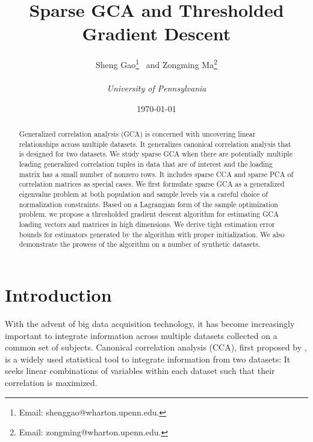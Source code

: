 \documentclass[11pt]{article}
\title{Sparse GCA and Thresholded Gradient Descent}
\author{Sheng Gao\footnote{Email: shenggao@wharton.upenn.edu.} 
~and Zongming Ma\footnote{Email: zongming@wharton.upenn.edu.}\\
~\\
\textit{University of Pennsylvania}}
\date{\today}
\newcommand{\0}{{\mathbf{0}}}
\begin{document}
 
      

 
\maketitle

\begin{abstract}%
Generalized correlation analysis (GCA) is concerned with uncovering linear relationships across multiple datasets. 
It generalizes canonical correlation analysis that is designed for two datasets.
We study sparse GCA when there are potentially multiple leading generalized correlation tuples in data that are of interest and the loading matrix has a small number of nonzero rows.
It includes sparse CCA and sparse PCA of correlation matrices as special cases.
We first formulate sparse GCA as a generalized eigenvalue problem at both population and sample levels via a careful choice of normalization constraints.
Based on a Lagrangian form of the sample optimization problem, we propose a thresholded gradient descent algorithm for estimating GCA loading vectors and matrices in high dimensions.
We derive tight estimation error bounds for estimators generated by the algorithm with proper initialization.
We also demonstrate the prowess of the algorithm on a number of synthetic datasets.
\end{abstract}
\tableofcontents

\section{Introduction}

With the advent of big data acquisition technology, 
it has become increasingly important to integrate information across 
multiple datasets collected on a common set of subjects. 
Canonical correlation analysis (CCA), first proposed by \citet{hotelling1992relations}, is a widely used statistical tool to integrate information from two datasets: It seeks linear combinations of variables within each dataset such that their correlation is maximized.
\end{document}

